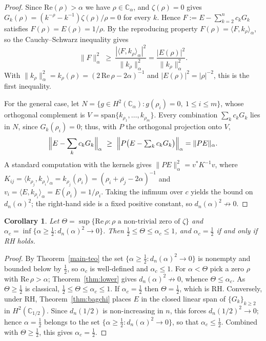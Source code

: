 \documentclass[11pt]{extarticle}
\numberwithin{equation}{section}
\theoremstyle{plain}
\newtheorem{corollary}[theorem]{Corollary}
\theoremstyle{remark}
\begin{document}
\begin{proof}
Since $\mathrm{Re}(\rho) > \alpha$ we have $\rho \in \mathbb{C}_\alpha$, and
$\zeta(\rho) = 0$ gives $G_k(\rho) = (k^{-\rho} - k^{-1})\zeta(\rho)/\rho = 0$ for
every $k$. Hence $F := E - \sum_{k=2}^{n} c_k G_k$ satisfies
$F(\rho) = E(\rho) = 1/\rho$. By the reproducing property
$F(\rho) = \langle F, k_\rho \rangle_\alpha$, so the Cauchy--Schwarz inequality gives
\[
\|F\|^2_\alpha \ \geq\ \frac{|\langle F, k_\rho \rangle_\alpha|^2}{\|k_\rho\|^2_\alpha}
= \frac{|E(\rho)|^2}{\|k_\rho\|^2_\alpha}.
\]
With $\|k_\rho\|^2_\alpha = k_\rho(\rho) = (2\,\mathrm{Re}\,\rho - 2\alpha)^{-1}$ and
$|E(\rho)|^2 = |\rho|^{-2}$, this is the first inequality.

For the general case, let $N = \{ g \in H^2(\mathbb{C}_\alpha) : g(\rho_i) = 0,\
1 \leq i \leq m \}$, whose orthogonal complement is
$V = \mathrm{span}\{ k_{\rho_1}, \dots, k_{\rho_m} \}$. Every combination
$\sum_k c_k G_k$ lies in $N$, since $G_k(\rho_i) = 0$; thus, with $P$ the orthogonal
projection onto $V$,
\[
\Bigl\| E - \sum_k c_k G_k \Bigr\|_\alpha
\ \geq\ \Bigl\| P\bigl( E - \textstyle\sum_k c_k G_k \bigr) \Bigr\|_\alpha
= \| P E \|_\alpha.
\]
A standard computation with the kernels gives
$\| P E \|^2_\alpha = v^{*} K^{-1} v$, where
$K_{ij} = \langle k_{\rho_j}, k_{\rho_i} \rangle_\alpha = k_{\rho_j}(\rho_i)
= (\rho_i + \overline{\rho_j} - 2\alpha)^{-1}$ and
$v_i = \langle E, k_{\rho_i} \rangle_\alpha = E(\rho_i) = 1/\rho_i$. Taking the
infimum over $c$ yields the bound on $d_n(\alpha)^2$; the right-hand side is a fixed
positive constant, so $d_n(\alpha)^2 \not\to 0$.
\end{proof}

\begin{corollary}\label{cor:sensor}
Let $\Theta = \sup\{\mathrm{Re}\,\rho : \rho \text{ a non-trivial zero of } \zeta\}$ and $\alpha_c = \inf\bigl\{\alpha \geq \tfrac12 : d_n(\alpha)^2 \to 0\bigr\}$. Then $\tfrac12 \leq \Theta \leq \alpha_c \leq 1$, and $\alpha_c = \tfrac12$ if and only if RH holds.
\end{corollary}

\begin{proof}
By Theorem~\ref{main-teo} the set $\{\alpha \geq \tfrac12 : d_n(\alpha)^2 \to 0\}$ is
nonempty and bounded below by $\tfrac12$, so $\alpha_c$ is well-defined and $\alpha_c \leq 1$.
For $\alpha < \Theta$ pick a zero $\rho$ with $\mathrm{Re}\,\rho > \alpha$;
Theorem~\ref{thm:lower} gives $d_n(\alpha)^2 \not\to 0$, whence $\Theta \leq \alpha_c$.
As $\Theta \geq \tfrac12$ is classical, $\tfrac12 \leq \Theta \leq \alpha_c \leq 1$. If
$\alpha_c = \tfrac12$ then $\Theta = \tfrac12$, which is RH. Conversely, under RH, Theorem~\ref{thm:bagchi} places $E$ in the closed linear span of
$\{G_k\}_{k\ge2}$ in $H^2(\mathbb{C}_{1/2})$. Since $d_n(1/2)$ is non-increasing
in $n$, this forces $d_n(1/2)^2\to0$; hence $\alpha=\tfrac12$ belongs to the set
$\{\alpha\ge\tfrac12:d_n(\alpha)^2\to0\}$, so that $\alpha_c\le\tfrac12$.
Combined with $\Theta\ge\tfrac12$, this gives $\alpha_c=\tfrac12$.
\end{proof}
\end{document}
